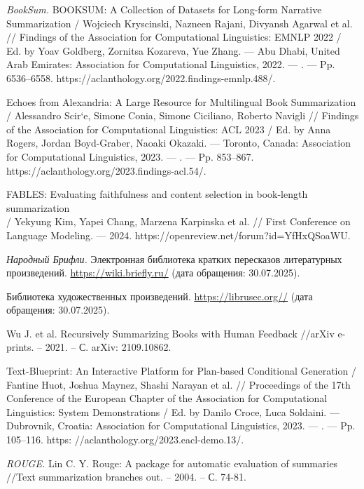 \documentclass{article}
\begin{document}
\begin{thebibliography}{99}
\textit{BookSum.}  
BOOKSUM: A Collection of Datasets for Long-form Narrative Summarization / Wojciech Kryscinski, Nazneen Rajani, Divyansh Agarwal et al. // Findings of the Association for Computational Linguistics: EMNLP 2022 / Ed. by Yoav Goldberg, Zornitsa Kozareva, Yue Zhang. — Abu Dhabi, United Arab Emirates: Association for Computational Linguistics, 2022. — . — Pp. 6536–6558. https://aclanthology.org/2022.findings-emnlp.488/.

Echoes from Alexandria: A Large Resource for Multilingual Book Summarization / Alessandro Scir`e, Simone Conia, Simone Ciciliano, Roberto Navigli // Findings of the Association for Computational Linguistics: ACL 2023 / Ed. by Anna Rogers, Jordan Boyd-Graber, Naoaki Okazaki. — Toronto, Canada: Association for Computational Linguistics, 2023. — . — Pp. 853–867. https://aclanthology.org/2023.findings-acl.54/.

FABLES: Evaluating faithfulness and content selection in book-length summarization \\/ Yekyung Kim, Yapei Chang, Marzena Karpinska et al. // First Conference on Language Modeling. — 2024. https://openreview.net/forum?id=YfHxQSoaWU.

\textit{Народный Брифли.}  
Электронная библиотека кратких пересказов литературных произведений.  
\url{https://wiki.briefly.ru/} (дата обращения: 30.07.2025).

Библиотека художественных произведений.  
\url{https://librusec.org//} (дата обращения: 30.07.2025).

Wu J. et al. Recursively Summarizing Books with Human Feedback //arXiv e-prints. – 2021. – С. arXiv: 2109.10862.

Text-Blueprint: An Interactive Platform for Plan-based Conditional Generation / Fantine Huot, Joshua Maynez, Shashi Narayan et al. // Proceedings of the 17th Conference of the European Chapter of the Association for Computational Linguistics:
System Demonstrations / Ed. by Danilo Croce, Luca Soldaini. — Dubrovnik, Croatia: Association for Computational Linguistics, 2023. — . — Pp. 105–116. https:
//aclanthology.org/2023.eacl-demo.13/.

\textit{ROUGE.}
Lin C. Y. Rouge: A package for automatic evaluation of summaries //Text summarization branches out. – 2004. – С. 74-81.


\end{thebibliography}
\end{document}
